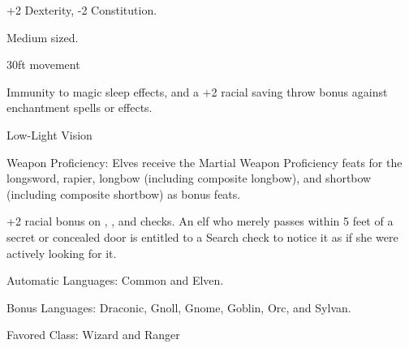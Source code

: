 
\begin{itemize*}
\item +2 Dexterity, -2 Constitution.
\item Medium sized.
\item 30ft movement
\item Immunity to magic sleep effects, and a +2 racial saving throw bonus against enchantment spells or effects.
\item Low-Light Vision
\item Weapon Proficiency: Elves receive the Martial Weapon Proficiency feats for the longsword, rapier, longbow (including composite longbow), and shortbow (including composite shortbow) as bonus feats.
\item +2 racial bonus on , , and  checks. An elf who merely passes within 5 feet of a secret or concealed door is entitled to a Search check to notice it as if she were actively looking for it.
\item Automatic Languages: Common and Elven.
\item Bonus Languages: Draconic, Gnoll, Gnome, Goblin, Orc, and Sylvan.
\item Favored Class: Wizard and Ranger
\end{itemize*}
